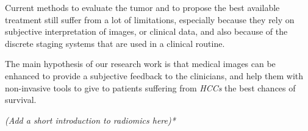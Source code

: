 \documentclass[]{article}
\begin{document}
Current methods to evaluate the tumor and to propose the best available
treatment still suffer from a lot of limitations, especially because
they rely on subjective interpretation of images, or clinical data, and
also because of the discrete staging systems that are used in a clinical
routine.

The main hypothesis of our research work is that medical images can be
enhanced to provide a subjective feedback to the clinicians, and help
them with non-invasive tools to give to patients suffering from
\emph{HCCs} the best chances of survival.

\emph{(Add a short introduction to radiomics here)*}


\newpage


\end{document}
